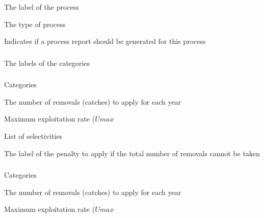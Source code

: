
 {The label of the process}

 {The type of process}

 {Indicates if a process report should be generated for this process}

\subsubsection[Ageing]{}

 {The labels of the categories}

\subsubsection[Initialisation Mortality Event]{}

 {Categories}

 {The number of removals (catches) to apply for each year}

 {Maximum exploitation rate ($Umax$}

 {List of selectivities}

 {The label of the penalty to apply if the total number of removals cannot be taken}

\subsubsection[Initialisation Mortality Event Biomass]{}

 {Categories}

 {The number of removals (catches) to apply for each year}

 {Maximum exploitation rate ($Umax$}

